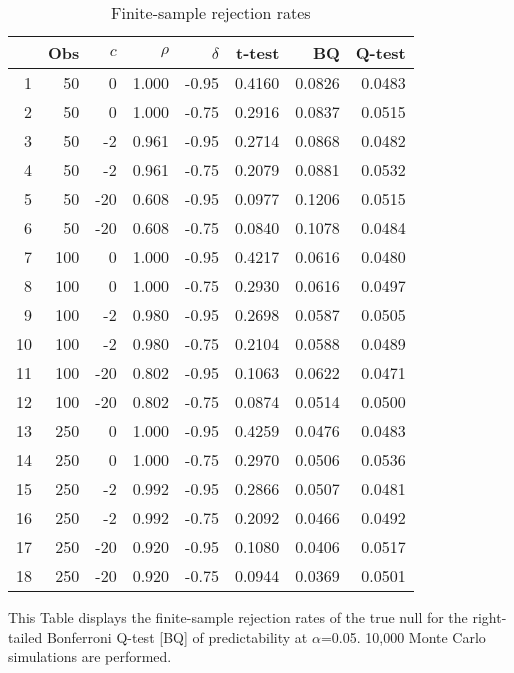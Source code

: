 \documentclass[11pt, a4paper]{article}
\begin{document}
\begin{table}[hb!]
\caption{Finite-sample rejection rates}
\label{tab:cy}
\centering

\begin{threeparttable}
\begin{tabular}{rrrrrrrr}
 \hline
 & Obs & $c$ & $\rho$ & $\delta$ & t-test & BQ & Q-test \\ 
  \hline
1 & 50 & 0 & 1.000 & -0.95 & 0.4160 & 0.0826 & 0.0483 \\ 
  2 & 50 & 0 & 1.000 & -0.75 & 0.2916 & 0.0837 & 0.0515 \\ 
  3 & 50 & -2 & 0.961 & -0.95 & 0.2714 & 0.0868 & 0.0482 \\ 
  4 & 50 & -2 & 0.961 & -0.75 & 0.2079 & 0.0881 & 0.0532 \\ 
  5 & 50 & -20 & 0.608 & -0.95 & 0.0977 & 0.1206 & 0.0515 \\ 
  6 & 50 & -20 & 0.608 & -0.75 & 0.0840 & 0.1078 & 0.0484 \\ 
  7 & 100 & 0 & 1.000 & -0.95 & 0.4217 & 0.0616 & 0.0480 \\ 
  8 & 100 & 0 & 1.000 & -0.75 & 0.2930 & 0.0616 & 0.0497 \\ 
  9 & 100 & -2 & 0.980 & -0.95 & 0.2698 & 0.0587 & 0.0505 \\ 
  10 & 100 & -2 & 0.980 & -0.75 & 0.2104 & 0.0588 & 0.0489 \\ 
  11 & 100 & -20 & 0.802 & -0.95 & 0.1063 & 0.0622 & 0.0471 \\ 
  12 & 100 & -20 & 0.802 & -0.75 & 0.0874 & 0.0514 & 0.0500 \\ 
  13 & 250 & 0 & 1.000 & -0.95 & 0.4259 & 0.0476 & 0.0483 \\ 
  14 & 250 & 0 & 1.000 & -0.75 & 0.2970 & 0.0506 & 0.0536 \\ 
  15 & 250 & -2 & 0.992 & -0.95 & 0.2866 & 0.0507 & 0.0481 \\ 
  16 & 250 & -2 & 0.992 & -0.75 & 0.2092 & 0.0466 & 0.0492 \\ 
  17 & 250 & -20 & 0.920 & -0.95 & 0.1080 & 0.0406 & 0.0517 \\ 
  18 & 250 & -20 & 0.920 & -0.75 & 0.0944 & 0.0369 & 0.0501 \\ 
   \hline
\end{tabular}
 \begin{tablenotes}
 \small
\item This Table displays the finite-sample rejection rates of the true null for the right-tailed Bonferroni Q-test [BQ] of predictability at $\alpha$=0.05. 10,000 Monte Carlo simulations are performed.
\end{tablenotes}
\end{threeparttable}
\end{table}
\end{document}

